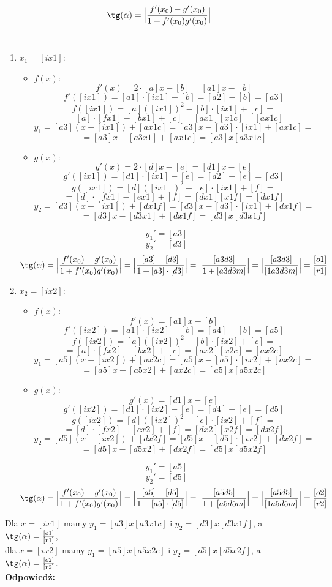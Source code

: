\documentclass[12pt, a4paper]{article}
\theoremstyle{definition} %
\newcommand{\rozwStop}{\newline}                                            %
\newcommand{\odpStart}{\noindent \textbf{Odpowiedź:}\newline}    %
\begin{document}
$$\tg(\alpha)=\Big|\frac{f'(x_0)-g'(x_0)}{1+f'(x_0)g'(x_0)}\Big| $$ \\
\begin{enumerate}
\item $x_1=[ix1]$:
\begin{itemize}
\item $f(x)$:
$$f'(x)=2\cdot[a]x-[b]=[a1]x-[b]$$
$$f'([ix1])=[a1]\cdot[ix1]-[b]=[a2]-[b]=[a3]$$
$$f([ix1])=[a]([ix1])^2-[b]\cdot[ix1]+[c]=$$
$$=[a]\cdot[fx1]-[bx1]+[c]=[ax1] [x1c]=[ax1c]$$
$$y_1=[a3](x-[ix1])+[ax1c]=[a3]x-[a3]\cdot[ix1]+[ax1c]=$$
$$=[a3]x-[a3x1]+[ax1c]=[a3]x [a3x1c]$$
\item $g(x)$:
$$g'(x)=2\cdot[d]x-[e]=[d1]x-[e]$$
$$g'([ix1])=[d1]\cdot[ix1]-[e]=[d2]-[e]=[d3]$$
$$g([ix1])=[d]([ix1])^2-[e]\cdot[ix1]+[f]=$$
$$=[d]\cdot[fx1]-[ex1]+[f]=[dx1] [x1f]=[dx1f]$$
$$y_2=[d3](x-[ix1])+[dx1f]=[d3]x-[d3]\cdot[ix1]+[dx1f]=$$
$$=[d3]x-[d3x1]+[dx1f]=[d3]x [d3x1f]$$
\end{itemize}
$$y_1'=[a3]$$
$$y_2'=[d3]$$
$$\tg(\alpha)=\Big|\frac{f'(x_0)-g'(x_0)}{1+f'(x_0)g'(x_0)}\Big| = \Big|\frac{[a3]-[d3]}{1+[a3]\cdot [d3]}\Big| = \Big|\frac{[a3d3]}{1+[a3d3m]}\Big|=
 \Big|\frac{[a3d3]}{[1a3d3m]}\Big| =\frac{[o1]}{[r1]} $$
\item $x_2=[ix2]$:
\begin{itemize}
\item $f(x)$:
$$f'(x)=[a1]x-[b]$$
$$f'([ix2])=[a1]\cdot[ix2]-[b]=[a4]-[b]=[a5]$$
$$f([ix2])=[a]([ix2])^2-[b]\cdot[ix2]+[c]=$$
$$=[a]\cdot[fx2]-[bx2]+[c]=[ax2] [x2c]=[ax2c]$$
$$y_1=[a5](x-[ix2])+[ax2c]=[a5]x-[a5]\cdot[ix2]+[ax2c]=$$
$$=[a5]x-[a5x2]+[ax2c]=[a5]x [a5x2c]$$
\item $g(x)$:
$$g'(x)=[d1]x-[e]$$
$$g'([ix2])=[d1]\cdot[ix2]-[e]=[d4]-[e]=[d5]$$
$$g([ix2])=[d]([ix2])^2-[e]\cdot[ix2]+[f]=$$
$$=[d]\cdot[fx2]-[ex2]+[f]=[dx2] [x2f]=[dx2f]$$
$$y_2=[d5](x-[ix2])+[dx2f]=[d5]x-[d5]\cdot[ix2]+[dx2f]=$$
$$=[d5]x-[d5x2]+[dx2f]=[d5]x [d5x2f]$$
\end{itemize}
$$y_1'=[a5]$$
$$y_2'=[d5]$$
$$\tg(\alpha)=\Big|\frac{f'(x_0)-g'(x_0)}{1+f'(x_0)g'(x_0)}\Big| = \Big|\frac{[a5]-[d5]}{1+[a5]\cdot [d5]}\Big| = \Big|\frac{[a5d5]}{1+[a5d5m]}\Big|=
 \Big|\frac{[a5d5]}{[1a5d5m]}\Big| =\frac{[o2]}{[r2]}$$
\end{enumerate}
Dla $x=[ix1]$ mamy $y_1=[a3]x [a3x1c]$ i $y_2=[d3]x [d3x1f]$, a $\tg(\alpha)= \frac{[o1]}{[r1]} $,\\
dla $x=[ix2]$ mamy $y_1=[a5]x [a5x2c]$ i $y_2=[d5]x [d5x2f]$, a $\tg(\alpha)= \frac{[o2]}{[r2]} $.\\
\rozwStop
\odpStart
\end{document}
